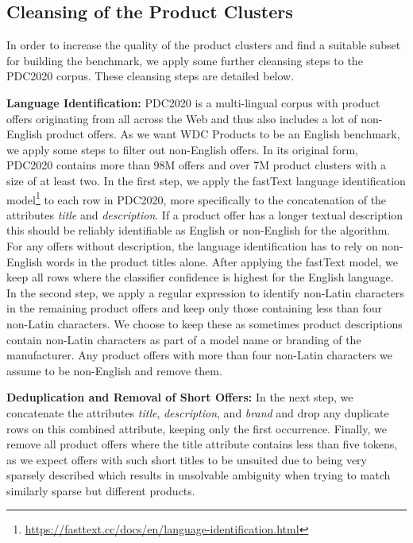 \documentclass[sigconf,edbt]{acmart-edbt2024}
\begin{document}
\subsection{Cleansing of the Product Clusters}
\label{subsec:corpuscleansing}

In order to increase the quality of the product clusters and find a suitable subset for building the benchmark, we apply some further cleansing steps to the PDC2020 corpus. These cleansing steps are detailed below.

\textbf{Language Identification:} PDC2020 is a multi-lingual corpus with product offers originating from all across the Web and thus also includes a lot of non-English product offers. As we want WDC Products to be an English benchmark, we apply some steps to filter out non-English offers. In its original form, PDC2020 contains more than 98M offers and over 7M product clusters with a size of at least two. In the first step, we apply the fastText language identification model\footnote{\url{https://fasttext.cc/docs/en/language-identification.html}} to each row in PDC2020, more specifically to the concatenation of the attributes \textit{title} and \textit{description}. If a product offer has a longer textual description this should be reliably identifiable as English or non-English for the algorithm. For any offers without description, the language identification has to rely on non-English words in the product titles alone. After applying the fastText model, we keep all rows where the classifier confidence is highest for the English language. In the second step, we apply a regular expression to identify non-Latin characters in the remaining product offers and keep only those containing less than four non-Latin characters. We choose to keep these as sometimes product descriptions contain non-Latin characters as part of a model name or branding of the manufacturer. Any product offers with more than four non-Latin characters we assume to be non-English and remove them. 

\textbf{Deduplication and Removal of Short Offers:} In the next step, we concatenate the attributes \textit{title}, \textit{description}, and \textit{brand} and drop any duplicate rows on this combined attribute, keeping only the first occurrence.  Finally, we remove all product offers where the title attribute contains less than five tokens, as we expect offers with such short titles to be unsuited due to being very sparsely described which results in unsolvable ambiguity when trying to match similarly sparse but different products.
\end{document}
